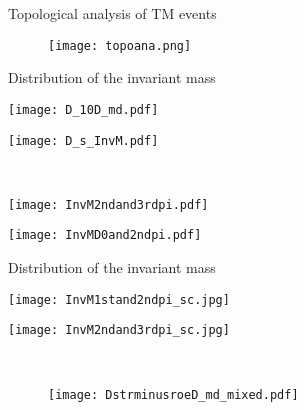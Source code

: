\documentclass[12pt]{beamer}
\begin{document}
\begin{frame}{Topological analysis of TM events}                                                                           
	\begin{figure}
		\centering
		\vspace{-0.6cm}\texttt{[image: topoana.png]}
	\end{figure}
\end{frame}

\begin{frame}{Distribution of the invariant mass}                                                                           
	\begin{minipage}[t]{0.45\textwidth}
		\centering
		\texttt{[image: D\_10D\_md.pdf]}
	  \end{minipage}\hfill
	  \begin{minipage}[t]{0.45\textwidth}
		\centering
		\texttt{[image: D\_s\_InvM.pdf]}
	  \end{minipage}\\[1em]
	  \begin{minipage}[b]{0.45\textwidth}
		\centering
		\texttt{[image: InvM2ndand3rdpi.pdf]}
	  \end{minipage}\hfill
	  \begin{minipage}[b]{0.45\textwidth}
		\centering
		\texttt{[image: InvMD0and2ndpi.pdf]}
	  \end{minipage}
\end{frame}

\begin{frame}{Distribution of the invariant mass}                                                                           
	\begin{minipage}[t]{0.45\textwidth}
		\centering
		\texttt{[image: InvM1stand2ndpi\_sc.jpg]}
	  \end{minipage}\hfill
	  \begin{minipage}[t]{0.45\textwidth}
		\centering
		\texttt{[image: InvM2ndand3rdpi\_sc.jpg]}
	  \end{minipage}\\[-0.5em]
	\begin{figure}
		\centering
		\texttt{[image: DstrminusroeD\_md\_mixed.pdf]}
	\end{figure}

\end{frame}
\end{document}
